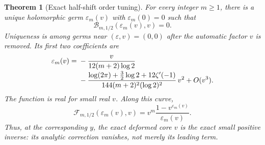 \documentclass[11pt,a4paper]{article}
\numberwithin{equation}{section}
\newtheorem{theorem}{Theorem}[section]
\theoremstyle{definition}\newtheorem{definition}[theorem]{Definition}
\theoremstyle{remark}\newtheorem{remark}[theorem]{Remark}
\newcommand{\eps}{\varepsilon}
\newcommand{\calF}{\mathscr F}
\newcommand{\calB}{\mathscr B}
\begin{document}
\begin{theorem}[Exact half-shift order tuning]
\label{rpt:thm:tuning}
For every integer $m\ge1$, there is a unique holomorphic germ $\eps_m(v)$ with $\eps_m(0)=0$ such that
\begin{equation}
\calB_{m,1/2}(\eps_m(v),v)=0.
\label{rpt:eq:tuningzero}
\end{equation}
Uniqueness is among germs near $(\eps,v)=(0,0)$ after the automatic factor $v$ is removed. Its first two coefficients are
\begin{align}
\eps_m(v)={}&-\frac{v}{12(m+2)\log2}
\notag\\[-2pt]
&-\frac{\log(2\pi)+\tfrac32\log2+12\zeta'(-1)}
 {144(m+2)^2(\log2)^2}\,v^2+O(v^3).
\label{rpt:eq:tuningcoeff}
\end{align}
The function is real for small real $v$. Along this curve,
\begin{equation}
\boxed{\quad
\calF_{m,1/2}(\eps_m(v),v)
=v^m\frac{1-v^{\eps_m(v)}}{\eps_m(v)}.\quad}
\label{rpt:eq:exacttune}
\end{equation}
Thus, at the corresponding $y$, the exact deformed core $v$ is the exact small positive inverse: its analytic correction vanishes, not merely its leading term.
\end{theorem}
\end{document}
